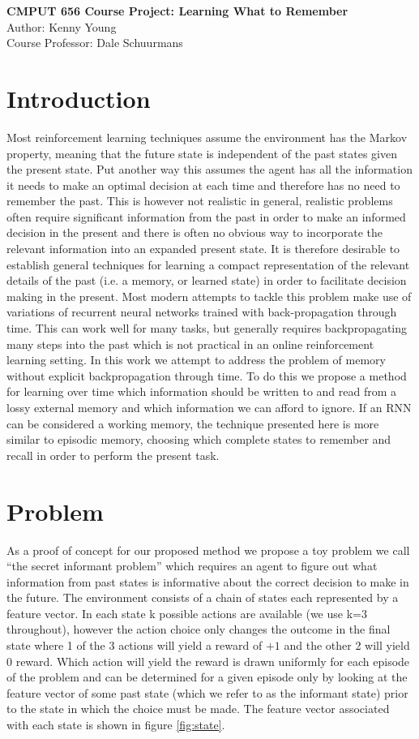 \documentclass{article}
\begin{document}
\begin{center}
{\Large \textbf{CMPUT 656 Course Project: Learning What to Remember}}\\
{Author: Kenny Young}\\
{Course Professor:  Dale Schuurmans}\\
\end{center}
\section*{Introduction}
Most reinforcement learning techniques assume the environment has the Markov property, meaning that the future state is independent of the past states given the present state. Put another way this assumes the agent has all the information it needs to make an optimal decision at each time and therefore has no need to remember the past. This is however not realistic in general, realistic problems often require significant information from the past in order to make an informed decision in the present and there is often no obvious way to incorporate the relevant information into an expanded present state. It is therefore desirable to establish general techniques for learning a compact representation of the relevant details of the past (i.e. a memory, or learned state) in order to facilitate decision making in the present.
Most modern attempts to tackle this problem make use of variations of recurrent neural networks trained with back-propagation through time. This can work well for many tasks, but generally requires backpropagating many steps into the past which is not practical in an online reinforcement learning setting. In this work we attempt to address the problem of memory without explicit backpropagation through time. To do this we propose a method for learning over time which information should be written to and read from a lossy external memory and which information we can afford to ignore. If an RNN can be considered a working memory, the technique presented here is more similar to episodic memory, choosing which complete states to remember and recall in order to perform the present task.

\section*{Problem}
As a proof of concept for our proposed method we propose a toy problem we call ``the secret informant problem'' which requires an agent to figure out what information from past states is informative about the correct decision to make in the future. The environment consists of a chain of states each represented by a feature vector. In each state k possible actions are available (we use k=3 throughout), however the action choice only changes the outcome in the final state where 1 of the 3 actions will yield a reward of $+1$ and the other 2 will yield $0$ reward. Which action will yield the reward is drawn uniformly for each episode of the problem and can be determined for a given episode only by looking at the feature vector of some past state (which we refer to as the informant state) prior to the state in which the choice must be made. The feature vector associated with each state is shown in figure \ref{fig:state}.
\end{document}
